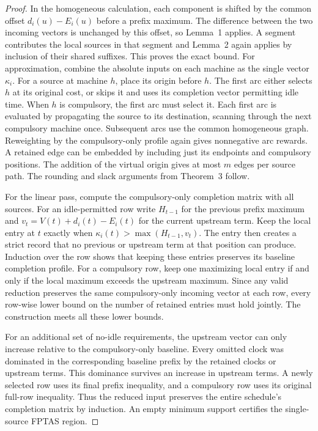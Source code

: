 \documentclass[11pt,letterpaper]{article}
\begin{document}
\begin{proof}
In the homogeneous calculation, each component is shifted by the common offset $d_i(u)-E_i(u)$ before a prefix maximum. The difference between the two incoming vectors is unchanged by this offset, so Lemma~1 applies. A segment contributes the local sources in that segment and Lemma~2 again applies by inclusion of their shared suffixes. This proves the exact bound. For approximation, combine the absolute inputs on each machine as the single vector $\kappa_i$. For a source at machine $h$, place its origin before $h$. The first arc either selects $h$ at its original cost, or skips it and uses its completion vector permitting idle time. When $h$ is compulsory, the first arc must select it. Each first arc is evaluated by propagating the source to its destination, scanning through the next compulsory machine once. Subsequent arcs use the common homogeneous graph. Reweighting by the compulsory-only profile again gives nonnegative arc rewards. A retained edge can be embedded by including just its endpoints and compulsory positions. The addition of the virtual origin gives at most $m$ edges per source path. The rounding and slack arguments from Theorem~3 follow.

For the linear pass, compute the compulsory-only completion matrix with all sources. For an idle-permitted row write $H_{t-1}$ for the previous prefix maximum and $v_t=V(t)+d_i(t)-E_i(t)$ for the current upstream term. Keep the local entry at $t$ exactly when $\kappa_i(t)>\max(H_{t-1},v_t)$. The entry then creates a strict record that no previous or upstream term at that position can produce. Induction over the row shows that keeping these entries preserves its baseline completion profile. For a compulsory row, keep one maximizing local entry if and only if the local maximum exceeds the upstream maximum. Since any valid reduction preserves the same compulsory-only incoming vector at each row, every row-wise lower bound on the number of retained entries must hold jointly. The construction meets all these lower bounds.

For an additional set of no-idle requirements, the upstream vector can only increase relative to the compulsory-only baseline. Every omitted clock was dominated in the corresponding baseline prefix by the retained clocks or upstream terms. This dominance survives an increase in upstream terms. A newly selected row uses its final prefix inequality, and a compulsory row uses its original full-row inequality. Thus the reduced input preserves the entire schedule's completion matrix by induction. An empty minimum support certifies the single-source FPTAS region.
\end{proof}
\end{document}
